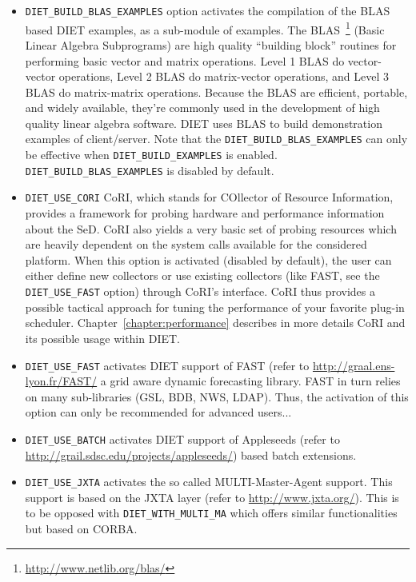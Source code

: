 \begin{itemize}
\item
  \verb+DIET_BUILD_BLAS_EXAMPLES+ option activates the compilation of
  the BLAS based DIET examples, as a sub-module of examples.
  The BLAS~\footnote{\url{http://www.netlib.org/blas/}} (Basic Linear
  Algebra Subprograms) are high quality ``building block'' routines for
  performing basic vector and matrix operations.
  Level 1 BLAS do vector-vector operations, Level 2 BLAS do matrix-vector
  operations, and Level 3 BLAS do matrix-matrix operations.
  Because the BLAS are efficient, portable, and widely available,
  they're commonly used in the development of high quality linear algebra
  software.
  DIET uses BLAS to build demonstration examples of client/server.
  Note that the  \verb+DIET_BUILD_BLAS_EXAMPLES+ can only be effective when 
  \verb+DIET_BUILD_EXAMPLES+ is enabled.
  \verb+DIET_BUILD_BLAS_EXAMPLES+ is disabled by default.

\item
  \verb+DIET_USE_CORI+ CoRI, which stands for COllector of Resource
  Information, provides a framework for probing hardware and performance
  information about the SeD.
  CoRI also yields a very basic set of probing resources which are
  heavily dependent on the system calls available for the considered platform.
  When this option is activated (disabled by default), the user can either
  define new collectors or use existing collectors (like FAST, see the
  \verb+DIET_USE_FAST+ option) through CoRI's interface.
  CoRI thus provides a possible tactical approach for tuning the performance
  of your favorite plug-in scheduler.
  Chapter~\ref{chapter:performance} describes in more details CoRI and its
  possible usage within DIET.

\item
  \verb+DIET_USE_FAST+ activates DIET support of FAST (refer to
  \url{http://graal.ens-lyon.fr/FAST/} a grid aware dynamic forecasting
  library. FAST in turn relies on many sub-libraries (GSL, BDB, NWS, LDAP).
  Thus, the activation of this option can only be recommended for advanced
  users...

\item
  \verb+DIET_USE_BATCH+ activates DIET support of Appleseeds (refer to
  \url{http://grail.sdsc.edu/projects/appleseeds/}) based batch
  extensions.

\item
  \verb+DIET_USE_JXTA+ activates the so called MULTI-Master-Agent
  support. This support is based on the JXTA layer (refer to
  \url{http://www.jxta.org/}). This is to be opposed with
  \verb+DIET_WITH_MULTI_MA+ which offers similar functionalities
  but based on CORBA.


\end{itemize}
